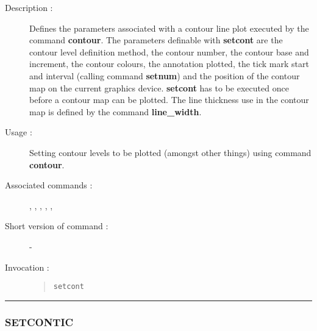 \begin{description}

\item[Description :] Defines the parameters associated with a contour
line plot executed by the command {\bf contour}.  The parameters
definable with {\bf setcont} are the contour level definition method,
the contour number, the contour base and increment, the contour
colours, the annotation plotted, the tick mark start and interval
(calling command {\bf setnum}) and the position of the contour map on
the current graphics device.  {\bf setcont} has to be executed once
before a contour map can be plotted.  The line thickness use in the
contour map is defined by the command {\bf line\_width}.

\item[Usage :] Setting contour levels to be plotted (amongst other
things) using command {\bf contour}.

\item[Associated commands :] {\tt {}}, 
{\tt {}}, {\tt {}}, 
{\tt {}}, {\tt {}}, 
{\tt {}}

\item[Short version of command :] -
\item[Invocation :]

\begin{quote}{\tt  setcont }\end{quote}

\end{description}

\hrule 
\subsubsection*{\label{SETCONTIC}SETCONTIC}

